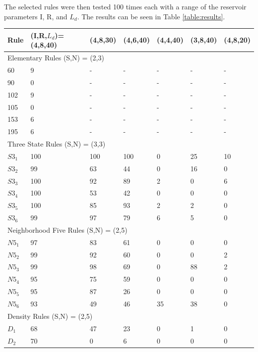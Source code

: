 \documentclass{facconf}
\begin{document}
\begin{multicols}{2}
The selected rules were then tested 100 times each with a range of the 
reservoir parameters I, R, and $L_{d}$.  The results can be seen in Table 
\ref{table:results}. 

\begin{table}[!htb] \centering
\small
\begin{tabular}{|l|l|l|l|l|l|l|}
\hline
Rule & (I,R,$L_{d}$)=(4,8,40) & (4,8,30) & (4,6,40) & (4,4,40) & (3,8,40) & 
(4,8,20) \\ \hline
\multicolumn{7}{|l|}{Elementary Rules (S,N) = (2,3)} \\ \hline
60 & 9 & - & - & - & - & - \\ \hline
90 & 0 & - & - & - & - & - \\ \hline
102 & 9 & - & - & - & - & - \\ \hline
105 & 0 & - & - & - & - & - \\ \hline
153 & 6 & - & - & - & - & - \\ \hline
195 & 6 & - & - & - & - & - \\ \hline
\multicolumn{7}{|l|}{Three State Rules (S,N) = (3,3)} \\ \hline
$S3_{1}$ & 100 & 100 & 100 & 0 & 25 & 10 \\ \hline
$S3_{2}$ & 99 & 63 & 44 & 0 & 16 & 0 \\ \hline
$S3_{3}$ & 100 & 92 & 89 & 2 & 0 & 6 \\ \hline
$S3_{4}$ & 100 & 53 & 42 & 0 & 0 & 0 \\ \hline
$S3_{5}$ & 100 & 85 & 93 & 2 & 2 & 0 \\ \hline
$S3_{6}$ & 99 & 97 & 79 & 6 & 5 & 0 \\ \hline
\multicolumn{7}{|l|}{Neighborhood Five Rules (S,N) = (2,5)} \\ \hline
$N5_{1}$ & 97 & 83 & 61 & 0 & 0 & 0 \\ \hline
$N5_{2}$ & 99 & 92 & 60 & 0 & 0 & 2 \\ \hline
$N5_{3}$ & 99 & 98 & 69 & 0 & 88 & 2  \\ \hline
$N5_{4}$ & 95 & 75 & 59 & 0 & 0 & 0 \\ \hline
$N5_{5}$ & 95 & 87 & 26 & 0 & 0 & 0 \\ \hline
$N5_{6}$ & 93 & 49 & 46 & 35 & 38 & 0  \\ \hline
\multicolumn{7}{|l|}{Density Rules (S,N) = (2,5)} \\ \hline
$D_{1}$ & 68 & 47 & 23 & 0 & 1 & 0  \\ \hline
$D_{2}$ & 70 & 0 & 6 & 0 & 0 & 0 \\ \hline

\end{tabular}
\end{table}
\end{multicols}
\end{document}

